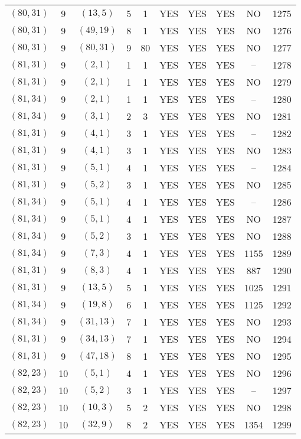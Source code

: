 \begin{longtable}{|c|c|c|c|c|c|c|c|c|c|}
$(80, 31)$ & 9 & $(13, 5)$ & 5 & 1 & YES & YES & YES & NO & 1275\\
$(80, 31)$ & 9 & $(49, 19)$ & 8 & 1 & YES & YES & YES & NO & 1276\\
$(80, 31)$ & 9 & $(80, 31)$ & 9 & 80 & YES & YES & YES & NO & 1277\\
$(81, 31)$ & 9 & $(2, 1)$ & 1 & 1 & YES & YES & YES & -- & 1278\\
$(81, 31)$ & 9 & $(2, 1)$ & 1 & 1 & YES & YES & YES & NO & 1279\\
$(81, 34)$ & 9 & $(2, 1)$ & 1 & 1 & YES & YES & YES & -- & 1280\\
$(81, 34)$ & 9 & $(3, 1)$ & 2 & 3 & YES & YES & YES & NO & 1281\\
$(81, 31)$ & 9 & $(4, 1)$ & 3 & 1 & YES & YES & YES & -- & 1282\\
$(81, 31)$ & 9 & $(4, 1)$ & 3 & 1 & YES & YES & YES & NO & 1283\\
$(81, 31)$ & 9 & $(5, 1)$ & 4 & 1 & YES & YES & YES & -- & 1284\\
$(81, 31)$ & 9 & $(5, 2)$ & 3 & 1 & YES & YES & YES & NO & 1285\\
$(81, 34)$ & 9 & $(5, 1)$ & 4 & 1 & YES & YES & YES & -- & 1286\\
$(81, 34)$ & 9 & $(5, 1)$ & 4 & 1 & YES & YES & YES & NO & 1287\\
$(81, 34)$ & 9 & $(5, 2)$ & 3 & 1 & YES & YES & YES & NO & 1288\\
$(81, 34)$ & 9 & $(7, 3)$ & 4 & 1 & YES & YES & YES & 1155 & 1289\\
$(81, 31)$ & 9 & $(8, 3)$ & 4 & 1 & YES & YES & YES & 887 & 1290\\
$(81, 31)$ & 9 & $(13, 5)$ & 5 & 1 & YES & YES & YES & 1025 & 1291\\
$(81, 34)$ & 9 & $(19, 8)$ & 6 & 1 & YES & YES & YES & 1125 & 1292\\
$(81, 34)$ & 9 & $(31, 13)$ & 7 & 1 & YES & YES & YES & NO & 1293\\
$(81, 31)$ & 9 & $(34, 13)$ & 7 & 1 & YES & YES & YES & NO & 1294\\
$(81, 31)$ & 9 & $(47, 18)$ & 8 & 1 & YES & YES & YES & NO & 1295\\
$(82, 23)$ & 10 & $(5, 1)$ & 4 & 1 & YES & YES & YES & NO & 1296\\
$(82, 23)$ & 10 & $(5, 2)$ & 3 & 1 & YES & YES & YES & -- & 1297\\
$(82, 23)$ & 10 & $(10, 3)$ & 5 & 2 & YES & YES & YES & NO & 1298\\
$(82, 23)$ & 10 & $(32, 9)$ & 8 & 2 & YES & YES & YES & 1354 & 1299\\

\end{longtable}
